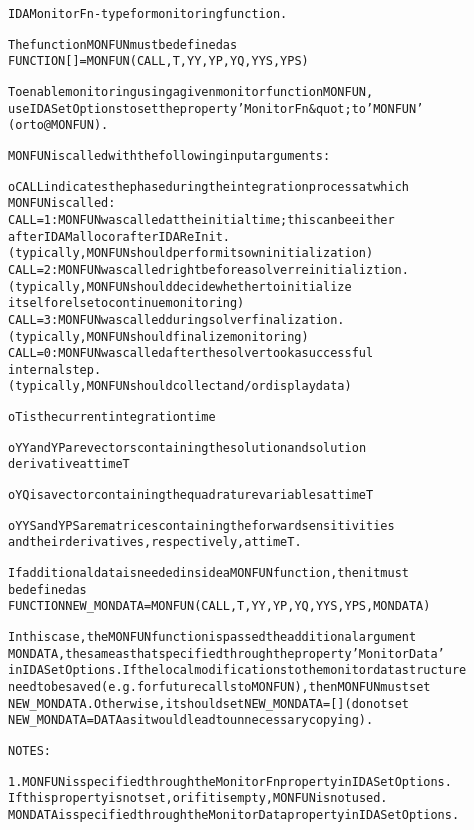 \begin{alltt}
IDAMonitorFn - type for monitoring function.

   The function MONFUN must be defined as
      FUNCTION [] = MONFUN(CALL, T, YY, YP, YQ, YYS, YPS)
 
   To enable monitoring using a given monitor function MONFUN,
   use IDASetOptions to set the property 'MonitorFn&quot; to 'MONFUN' 
   (or to @MONFUN).

   MONFUN is called with the following input arguments:

   o CALL indicates the phase during the integration process at which
     MONFUN is called:
     CALL=1 : MONFUN was called at the initial time; this can be either 
              after IDAMalloc or after IDAReInit.
              (typically, MONFUN should perform its own initialization)
     CALL=2 : MONFUN was called right before a solver reinitializtion.
              (typically, MONFUN should decide whether to initialize
              itself or else to continue monitoring)
     CALL=3 : MONFUN was called during solver finalization.
              (typically, MONFUN should finalize monitoring)
     CALL=0 : MONFUN was called after the solver took a successful
              internal step.
              (typically, MONFUN should collect and/or display data)

   o T is the current integration time

   o YY and YP are vectors containing the solution and solution 
     derivative at time T

   o YQ is a vector containing the quadrature variables at time T

   o YYS and YPS are matrices containing the forward sensitivities
     and their derivatives, respectively, at time T.

   If additional data is needed inside a MONFUN function, then it must 
   be defined as
      FUNCTION NEW_MONDATA = MONFUN(CALL, T, YY, YP, YQ, YYS, YPS, MONDATA)

   In this case, the MONFUN function is passed the additional argument
   MONDATA, the same as that specified through the property 'MonitorData'
   in IDASetOptions. If the local modifications to the monitor data structure 
   need to be saved (e.g. for future calls to MONFUN), then MONFUN must set
   NEW_MONDATA. Otherwise, it should set NEW_MONDATA=[] (do not set 
   NEW_MONDATA = DATA as it would lead to unnecessary copying).

   NOTES: 
   
   1. MONFUN is specified through the MonitorFn property in IDASetOptions. 
      If this property is not set, or if it is empty, MONFUN is not used.
      MONDATA is specified through the MonitorData property in IDASetOptions.


\end{alltt}
